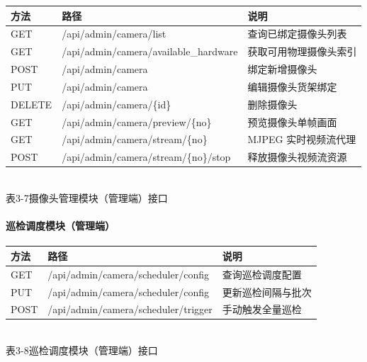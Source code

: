 \begin{center}
  \renewcommand{\arraystretch}{1.4}
  \begin{tabular}{|>{\centering\arraybackslash}m{1.5cm}|>{\centering\arraybackslash}m{6cm}|>{\centering\arraybackslash}m{5.2cm}|}
    \hline
    \textbf{方法} & \textbf{路径}                           & \textbf{说明}   \\ \hline
    GET         & /api/admin/camera/list                & 查询已绑定摄像头列表    \\ \hline
    GET         & /api/admin/camera/available\_hardware & 获取可用物理摄像头索引   \\ \hline
    POST        & /api/admin/camera                     & 绑定新增摄像头       \\ \hline
    PUT         & /api/admin/camera                     & 编辑摄像头货架绑定     \\ \hline
    DELETE      & /api/admin/camera/\{id\}              & 删除摄像头         \\ \hline
    GET         & /api/admin/camera/preview/\{no\}      & 预览摄像头单帧画面     \\ \hline
    GET         & /api/admin/camera/stream/\{no\}       & MJPEG 实时视频流代理 \\ \hline
    POST        & /api/admin/camera/stream/\{no\}/stop  & 释放摄像头视频流资源    \\ \hline
  \end{tabular}
  \\[0.3em]
  {表3-7\quad 摄像头管理模块（管理端）接口}
\end{center}

\paragraph{巡检调度模块（管理端）}

\begin{center}
  \renewcommand{\arraystretch}{1.4}
  \begin{tabular}{|>{\centering\arraybackslash}m{1.5cm}|>{\centering\arraybackslash}m{6.0cm}|>{\centering\arraybackslash}m{5.2cm}|}
    \hline
    \textbf{方法} & \textbf{路径}                         & \textbf{说明} \\ \hline
    GET         & /api/admin/camera/scheduler/config  & 查询巡检调度配置    \\ \hline
    PUT         & /api/admin/camera/scheduler/config  & 更新巡检间隔与批次   \\ \hline
    POST        & /api/admin/camera/scheduler/trigger & 手动触发全量巡检    \\ \hline
  \end{tabular}
  \\[0.3em]
  {表3-8\quad 巡检调度模块（管理端）接口}
\end{center}

